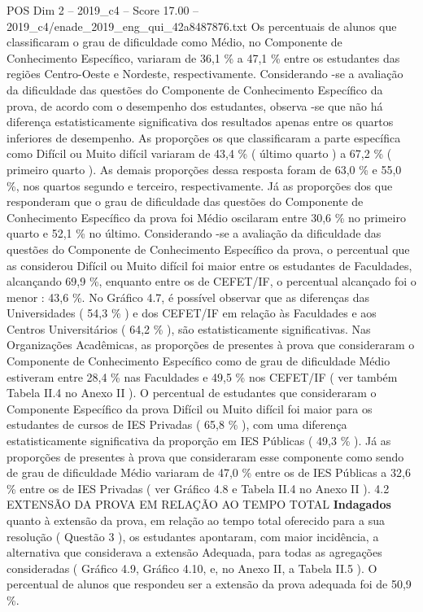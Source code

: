 \begin{textsample}{POS Dim 2 – 2019\_c4 – Score 17.00 – 2019\_c4/enade\_2019\_eng\_qui\_42a8487876.txt}
Os percentuais de alunos que classificaram o grau de dificuldade como Médio, no Componente de Conhecimento Específico, variaram de 36,1 \% a 47,1 \% entre os estudantes das regiões Centro-Oeste e Nordeste, respectivamente.
Considerando -se a avaliação da dificuldade das questões do Componente de Conhecimento Específico da prova, de acordo com o desempenho dos estudantes, observa -se que não há diferença estatisticamente significativa dos resultados apenas entre os quartos inferiores de desempenho.
As proporções os que classificaram a parte específica como Difícil ou Muito difícil variaram de 43,4 \% ( último quarto ) a 67,2 \% ( primeiro quarto ).
As demais proporções dessa resposta foram de 63,0 \% e 55,0 \%, nos quartos segundo e terceiro, respectivamente.
Já as proporções dos que responderam que o grau de dificuldade das questões do Componente de Conhecimento Específico da prova foi Médio oscilaram entre 30,6 \% no primeiro quarto e 52,1 \% no último.
Considerando -se a avaliação da dificuldade das questões do Componente de Conhecimento Específico da prova, o percentual que as considerou Difícil ou Muito difícil foi maior entre os estudantes de Faculdades, alcançando 69,9 \%, enquanto entre os de CEFET/IF, o percentual alcançado foi o menor : 43,6 \%.
No Gráfico 4.7, é possível observar que as diferenças das Universidades ( 54,3 \% ) e dos CEFET/IF em relação às Faculdades e aos Centros Universitários ( 64,2 \% ), são estatisticamente significativas.
Nas Organizações Acadêmicas, as proporções de presentes à prova que consideraram o Componente de Conhecimento Específico como de grau de dificuldade Médio estiveram entre 28,4 \% nas Faculdades e 49,5 \% nos CEFET/IF ( ver também Tabela II.4 no Anexo II ).
O percentual de estudantes que consideraram o Componente Específico da prova Difícil ou Muito difícil foi maior para os estudantes de cursos de IES Privadas ( 65,8 \% ), com uma diferença estatisticamente significativa da proporção em IES Públicas ( 49,3 \% ).
Já as proporções de presentes à prova que consideraram esse componente como sendo de grau de dificuldade Médio variaram de 47,0 \% entre os de IES Públicas a 32,6 \% entre os de IES Privadas ( ver Gráfico 4.8 e Tabela II.4 no Anexo II ). 4.2 EXTENSÃO DA PROVA EM RELAÇÃO AO TEMPO TOTAL \textbf{Indagados} quanto à extensão da prova, em relação ao tempo total oferecido para a sua resolução ( Questão 3 ), os estudantes apontaram, com maior incidência, a alternativa que considerava a extensão Adequada, para todas as agregações consideradas ( Gráfico 4.9, Gráfico 4.10, e, no Anexo II, a Tabela II.5 ).
O percentual de alunos que respondeu ser a extensão da prova adequada foi de 50,9 \%.

\end{textsample}
